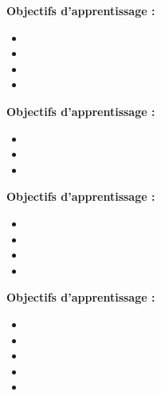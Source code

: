 \par\noindent\textbf{Objectifs d'apprentissage :}
\begin{itemize}
    \item \useobj[C4B3da]
    \item \useobj[C4B3db]
    \item \useobj[C4B3dc]
    \item \useobj[C4B3dd]
\end{itemize}
\endsequence

\par\noindent\textbf{Objectifs d'apprentissage :}
\begin{itemize}
    \item \useobj[C4C3ba]
    \item \useobj[C4C3bb]
    \item \useobj[C4C3bc]
\end{itemize}
\endsequence

\par\noindent\textbf{Objectifs d'apprentissage :}
\begin{itemize}
    \item \useobj[C4B3ba]
    \item \useobj[C4B3bb]
    \item \useobj[C4B3bc]
    \item \useobj[C4B3bd]
\end{itemize}
\endsequence

\par\noindent\textbf{Objectifs d'apprentissage :}
\begin{itemize}
    \item \useobj[C4E3aa]
    \item \useobj[C4E3ab]
    \item \useobj[C4E3ac]
    \item \useobj[C4E3ad]
    \item \useobj[C4E3ae]
\end{itemize}
\endsequence

\endlevel
